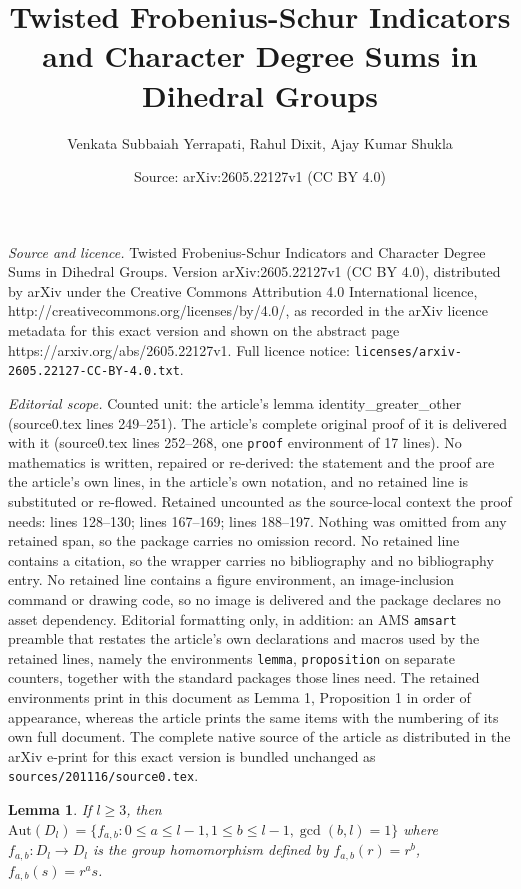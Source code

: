 \documentclass[10pt,a4paper]{amsart}
\title{Twisted Frobenius-Schur Indicators and Character Degree Sums in Dihedral Groups}
\author{Venkata Subbaiah Yerrapati, Rahul Dixit, Ajay Kumar Shukla}
\date{Source: arXiv:2605.22127v1 (CC BY 4.0)}
\newtheorem{lemma}{Lemma}
\begin{document}
\maketitle

\noindent\emph{Source and licence.} Twisted Frobenius-Schur Indicators and Character Degree Sums in Dihedral Groups. Version arXiv:2605.22127v1 (CC BY 4.0), distributed by arXiv under the Creative Commons Attribution 4.0 International licence, http://creativecommons.org/licenses/by/4.0/, as recorded in the arXiv licence metadata for this exact version and shown on the abstract page https://arxiv.org/abs/2605.22127v1. Full licence notice: \texttt{licenses/arxiv-2605.22127-CC-BY-4.0.txt}.\par\smallskip

\noindent\textit{Editorial scope.} Counted unit: the article's lemma identity\_greater\_other (source0.tex lines 249--251). The article's complete original proof of it is delivered with it (source0.tex lines 252--268, one \texttt{proof} environment of 17 lines). No mathematics is written, repaired or re-derived: the statement and the proof are the article's own lines, in the article's own notation, and no retained line is substituted or re-flowed.  Retained uncounted as the source-local context the proof needs: lines 128--130; lines 167--169; lines 188--197.  Nothing was omitted from any retained span, so the package carries no omission record.  No retained line contains a citation, so the wrapper carries no bibliography and no bibliography entry.  No retained line contains a figure environment, an image-inclusion command or drawing code, so no image is delivered and the package declares no asset dependency.  Editorial formatting only, in addition: an AMS \texttt{amsart} preamble that restates the article's own declarations and macros used by the retained lines, namely the environments \texttt{lemma}, \texttt{proposition} on separate counters, together with the standard packages those lines need.  The retained environments print in this document as Lemma 1, Proposition 1 in order of appearance, whereas the article prints the same items with the numbering of its own full document.  The complete native source of the article as distributed in the arXiv e-print for this exact version is bundled unchanged as \texttt{sources/201116/source0.tex}.
    \begin{lemma}\label{automorphism_characterization_of_D_l}
        If $l \geq 3$, then $\mathrm{Aut}(D_{l}) = \{f_{a,b} : 0 \leq a \leq l - 1, 1 \leq b \leq l - 1, \gcd(b, l) = 1\}$ where $f_{a,b}: D_{l} \to D_{l}$ is the group homomorphism defined by $f_{a, b}(r) = r^b$, $f_{a,b}(s) = r^as$.
    \end{lemma}
\end{document}
